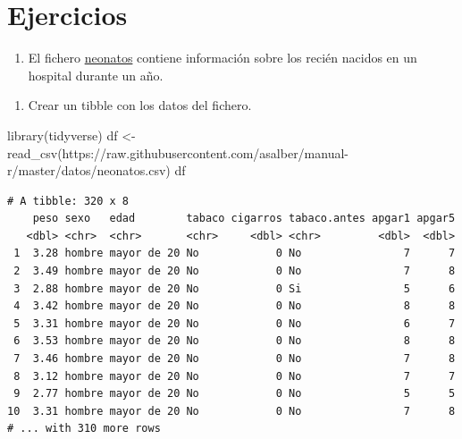 \documentclass[
  a4paper,
]{scrreport}
\newenvironment{Shaded}{\begin{snugshade}}{\end{snugshade}}
\newcommand{\FunctionTok}[1]{\textcolor[rgb]{0.28,0.35,0.67}{#1}}
\newcommand{\NormalTok}[1]{\textcolor[rgb]{0.00,0.23,0.31}{#1}}
\newcommand{\OtherTok}[1]{\textcolor[rgb]{0.00,0.23,0.31}{#1}}
\newcommand{\StringTok}[1]{\textcolor[rgb]{0.13,0.47,0.30}{#1}}
\providecommand{\tightlist}{%
  \setlength{\itemsep}{0pt}\setlength{\parskip}{0pt}}\usepackage{longtable,booktabs,array}
\theoremstyle{definition}
\theoremstyle{definition}
\theoremstyle{remark}
\begin{document}
\hypertarget{ejercicios-4}{%
\section{Ejercicios}\label{ejercicios-4}}

\begin{enumerate}
\def\labelenumi{\arabic{enumi}.}
\tightlist
\item
  El fichero
  \href{(https://raw.githubusercontent.com/asalber/manual-r/master/datos/neonatos.csv)}{neonatos}
  contiene información sobre los recién nacidos en un hospital durante
  un año.
\end{enumerate}

\begin{enumerate}
\def\labelenumi{\alph{enumi}.}
\tightlist
\item
  Crear un tibble con los datos del fichero.
\end{enumerate}

\begin{tcolorbox}[enhanced jigsaw, rightrule=.15mm, bottomrule=.15mm, opacitybacktitle=0.6, leftrule=.75mm, breakable, toptitle=1mm, left=2mm, colbacktitle=quarto-callout-note-color!10!white, colback=white, arc=.35mm, title=\textcolor{quarto-callout-note-color}{\faInfo}\hspace{0.5em}{Solución}, toprule=.15mm, colframe=quarto-callout-note-color-frame, bottomtitle=1mm, opacityback=0, coltitle=black, titlerule=0mm]

\begin{Shaded}
\begin{Highlighting}[]
\FunctionTok{library}\NormalTok{(tidyverse)}
\NormalTok{df }\OtherTok{\textless{}{-}} \FunctionTok{read\_csv}\NormalTok{(}\StringTok{\textquotesingle{}https://raw.githubusercontent.com/asalber/manual{-}r/master/datos/neonatos.csv\textquotesingle{}}\NormalTok{)}
\NormalTok{df}
\end{Highlighting}
\end{Shaded}

\begin{verbatim}
# A tibble: 320 x 8
    peso sexo   edad        tabaco cigarros tabaco.antes apgar1 apgar5
   <dbl> <chr>  <chr>       <chr>     <dbl> <chr>         <dbl>  <dbl>
 1  3.28 hombre mayor de 20 No            0 No                7      7
 2  3.49 hombre mayor de 20 No            0 No                7      8
 3  2.88 hombre mayor de 20 No            0 Si                5      6
 4  3.42 hombre mayor de 20 No            0 No                8      8
 5  3.31 hombre mayor de 20 No            0 No                6      7
 6  3.53 hombre mayor de 20 No            0 No                8      8
 7  3.46 hombre mayor de 20 No            0 No                7      8
 8  3.12 hombre mayor de 20 No            0 No                7      7
 9  2.77 hombre mayor de 20 No            0 No                5      5
10  3.31 hombre mayor de 20 No            0 No                7      8
# ... with 310 more rows
\end{verbatim}

\end{tcolorbox}
\end{document}
